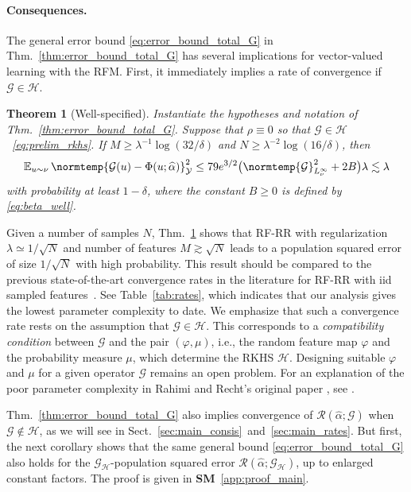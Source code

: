 \documentclass{article}
\theoremstyle{plain}
\newtheorem{theorem}{Theorem}[section]
\theoremstyle{my_def}
\theoremstyle{my_rem}
\numberwithin{equation}{section}
\numberwithin{theorem}{section}%
\newcommand{\E}{\mathbb{E}}
\newcommand{\scrR}{\mathscr{R}}
\newcommand{\cG}{\mathcal{G}}
\newcommand{\cH}{\mathcal{H}}
\newcommand{\cY}{\mathcal{Y}}
\newcommand{\norm}{\normtemp}
\renewcommand{\hat}{\widehat}
\renewcommand{\E}{\operatorname{\mathbb{E}}} %
\newcommand{\al}{\alpha}
\newcommand{\GH}{\cG_{\cH}}
\renewcommand{\phi}{\varphi}
\newcommand{\alhat}{\hat{\al}}
\begin{document}
\paragraph{Consequences.}
The general error bound \eqref{eq:error_bound_total_G} in Thm.~\ref{thm:error_bound_total_G} has several implications for vector-valued learning with the RFM. First, it immediately implies a rate of convergence if $\cG\in\cH$.
\begin{theorem}[Well-specified]\label{thm:error_bound_total_well}
    Instantiate the hypotheses and notation of Thm.~\ref{thm:error_bound_total_G}. Suppose that $\rho\equiv 0$ so that $\cG\in\cH$~\eqref{eq:prelim_rkhs}. If $M \ge \lambda^{-1}\log(32/\delta)$ and $N\geq \lambda^{-2}\log(16/\delta)$, then
    \begin{equation}\label{eq:error_bound_total_G_well}
        \E_{u\sim\nu}\norm{\cG(u)-\Phi(u;\alhat)}_{\cY}^2 \leq 79e^{3/2}\bigl(\norm{\cG}_{L^\infty_\nu}^2 + 2B\bigr)\lambda\lesssim \lambda
    \end{equation}
    with probability at least $1-\delta$, where the constant $B\geq 0$ is defined by \eqref{eq:beta_well}.
\end{theorem}
Given a number of samples $N$, Thm.~\ref{thm:error_bound_total_well} shows that RF-RR with regularization $\lambda\simeq 1/\sqrt{N}$ and number of features $M\gtrsim \sqrt{N}$ leads to a population squared error of size $1/\sqrt{N}$ with high probability. This result should be compared to the previous state-of-the-art convergence rates in the literature for RF-RR with iid sampled features~\citep{bach2017equivalence,li2021towards,RR2008,rudi2017generalization}. See Table~\ref{tab:rates}, which indicates that our analysis gives the lowest parameter complexity to date. We emphasize that such a convergence rate rests on the assumption that $\cG \in \cH$. This corresponds to a \emph{compatibility condition} between $\cG$ and the pair $(\phi,\mu)$, i.e., the random feature map $\phi$ and the probability measure $\mu$, which determine the RKHS $\cH$. Designing suitable $\phi$ and $\mu$ for a given operator $\cG$ remains an open problem. For an explanation of the poor parameter complexity in Rahimi and Recht's original paper \cite{RR2008}, see \cite[Appendix E]{sun2018but}.

Thm.~\ref{thm:error_bound_total_G} also implies convergence of $\scrR(\alhat;\cG)$ when $\cG\not\in\cH$, as we will see in Sect.~\ref{sec:main_consis}~and~\ref{sec:main_rates}. But first, the next corollary shows that the same general bound \eqref{eq:error_bound_total_G} also holds for the $\GH$-population squared error $\scrR(\alhat;\GH)$, up to enlarged constant factors. The proof is given in {\bf SM}~\ref{app:proof_main}.
\end{document}
